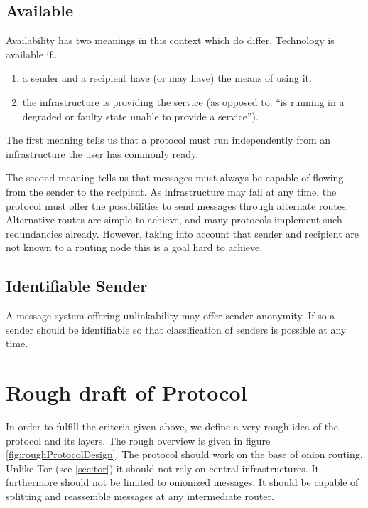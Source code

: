 \subsection{Available}
Availability has two meanings in this context which do differ. Technology is available if\ldots

\begin{enumerate}
	\item a sender and a recipient have (or may have) the means of using it.
	\item the infrastructure is providing the service (as opposed to: ``is running in a degraded or faulty state unable to provide a service'').
\end{enumerate}

The first meaning tells us that a protocol must run independently from an infrastructure the user has commonly ready.

The second meaning tells us that messages must always be capable of flowing from the sender to the recipient. As infrastructure may fail at any time, the protocol must offer the possibilities to send messages through alternate routes. Alternative routes are simple to achieve, and many protocols implement such redundancies already. However, taking into account that sender and recipient are not known to a routing node this is a goal hard to achieve.

\subsection{Identifiable Sender}
A message system offering unlinkability may offer sender anonymity. If so a sender should be identifiable so that classification of senders is possible at any time.

\section{Rough draft of Protocol}

In order to fulfill the criteria given above, we define a very rough idea of the protocol and its layers. The rough overview is given in figure \ref{fig:roughProtocolDesign}. The protocol should work on the base of onion routing. Unlike Tor (see \ref{sec:tor}) it should not rely on central infrastructures. It furthermore should not be limited to onionized messages. It should be capable of splitting and reassemble messages at any intermediate router.

